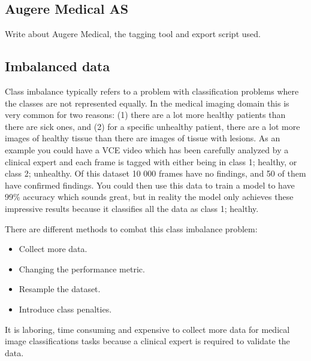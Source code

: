 \documentclass[thesis.tex]{subfiles}
\begin{document}
\subsection{Augere Medical AS} \label{sec:augere_medical}
Write about Augere Medical, the tagging tool and export script used.



\subsection{Imbalanced data}
Class imbalance typically refers to a problem with classification problems where the classes are not represented equally. In the medical imaging domain this is very common for two reasons: (1) there are a lot more healthy patients than there are sick ones, and (2) for a specific unhealthy patient, there are a lot more images of healthy tissue than there are images of tissue with lesions.
As an example you could have a VCE video which has been carefully analyzed by a clinical expert and each frame is tagged with either being in class 1; healthy, or class 2; unhealthy. Of this dataset 10 000 frames have no findings, and 50 of them have confirmed findings. You could then use this data to train a model to have 99\% accuracy which sounds great, but in reality the model only achieves these impressive results because it classifies all the data as class 1; healthy.

There are different methods to combat this class imbalance problem:
\begin{itemize}
\item Collect more data.
\item Changing the performance metric.
\item Resample the dataset.
\item Introduce class penalties.
\end{itemize}
It is laboring, time consuming and expensive to collect more data for medical image classifications tasks because a clinical expert is required to validate the data. 
\end{document}
